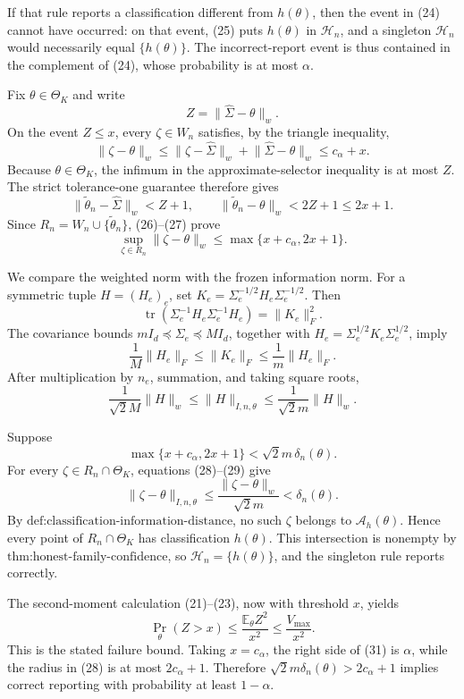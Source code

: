 If that rule reports a classification different from \(h(\theta)\), then the event in (24) cannot have occurred: on that event, (25) puts \(h(\theta)\) in \(\mathcal H_n\), and a singleton \(\mathcal H_n\) would necessarily equal \(\{h(\theta)\}\).  The incorrect-report event is thus contained in the complement of (24), whose probability is at most \(\alpha\).

Fix \(\theta\in\Theta_K\) and write
\[
 Z=\lVert\widehat\Sigma-\theta\rVert_w.
\]
On the event \(Z\le x\), every \(\zeta\in W_n\) satisfies, by the triangle inequality,
\[
 \lVert\zeta-\theta\rVert_w
 \le\lVert\zeta-\widehat\Sigma\rVert_w
   +\lVert\widehat\Sigma-\theta\rVert_w
 \le c_\alpha+x. \tag{26}
\]
Because \(\theta\in\Theta_K\), the infimum in the approximate-selector inequality is at most \(Z\).  The strict tolerance-one guarantee therefore gives
\[
 \lVert\widetilde\theta_n-\widehat\Sigma\rVert_w<Z+1,
 \qquad
 \lVert\widetilde\theta_n-\theta\rVert_w<2Z+1\le2x+1. \tag{27}
\]
Since \(R_n=W_n\cup\{\widetilde\theta_n\}\), (26)--(27) prove
\[
 \sup_{\zeta\in R_n}\lVert\zeta-\theta\rVert_w
 \le\max\{x+c_\alpha,2x+1\}. \tag{28}
\]

We compare the weighted norm with the frozen information norm.  For a symmetric tuple \(H=(H_e)_e\), set
\(K_e=\Sigma_e^{-1/2}H_e\Sigma_e^{-1/2}\).  Then
\[
 \operatorname{tr}(\Sigma_e^{-1}H_e\Sigma_e^{-1}H_e)=\lVert K_e\rVert_F^2.
\]
The covariance bounds \(mI_d\preceq\Sigma_e\preceq MI_d\), together with
\(H_e=\Sigma_e^{1/2}K_e\Sigma_e^{1/2}\), imply
\[
 \frac1M\lVert H_e\rVert_F\le\lVert K_e\rVert_F
 \le\frac1m\lVert H_e\rVert_F.
\]
After multiplication by \(n_e\), summation, and taking square roots,
\[
 \frac{1}{\sqrt2M}\lVert H\rVert_w
 \le\lVert H\rVert_{I,n,\theta}
 \le\frac{1}{\sqrt2m}\lVert H\rVert_w. \tag{29}
\]

Suppose
\[
 \max\{x+c_\alpha,2x+1\}<\sqrt2m\,\delta_n(\theta).
\]
For every \(\zeta\in R_n\cap\Theta_K\), equations (28)--(29) give
\[
 \lVert\zeta-\theta\rVert_{I,n,\theta}
 \le\frac{\lVert\zeta-\theta\rVert_w}{\sqrt2m}
 <\delta_n(\theta). \tag{30}
\]
By \(\text{def:classification-information-distance}\), no such \(\zeta\) belongs to \(\mathcal A_h(\theta)\).  Hence every point of \(R_n\cap\Theta_K\) has classification \(h(\theta)\).  This intersection is nonempty by \(\text{thm:honest-family-confidence}\), so \(\mathcal H_n=\{h(\theta)\}\), and the singleton rule reports correctly.

The second-moment calculation (21)--(23), now with threshold \(x\), yields
\[
 \Pr_\theta(Z>x)\le\frac{\mathbb E_\theta Z^2}{x^2}
 \le\frac{V_{\max}}{x^2}. \tag{31}
\]
This is the stated failure bound.  Taking \(x=c_\alpha\), the right side of (31) is \(\alpha\), while the radius in (28) is at most \(2c_\alpha+1\).  Therefore \(\sqrt2m\delta_n(\theta)>2c_\alpha+1\) implies correct reporting with probability at least \(1-\alpha\).

